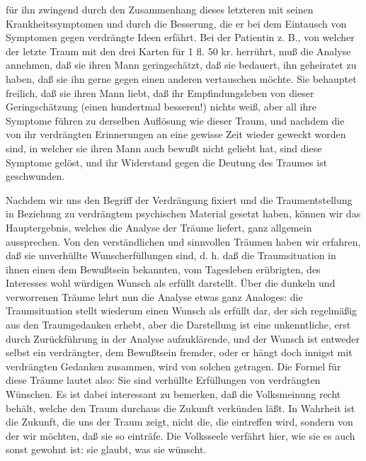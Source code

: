 \documentclass[twoside=true,titlepage=false,open=any, parskip=never, fontsize=10pt, headings=small, chapterprefix=false, appendixprefix=false]{scrbook}
\begin{document}
        \pstart
        für ihn zwingend durch den Zusammenhang dieses letzteren mit seinen
               Krankheitssymptomen und durch die Besserung, die er bei dem Eintausch von
               Symptomen gegen verdrängte Ideen erfährt. Bei der Patientin z. B., von welcher
               der letzte Traum mit den drei Karten für 1 fl. 50 kr. herrührt, muß die
               Analyse annehmen, daß sie ihren Mann geringschätzt, daß sie bedauert, ihn
               geheiratet zu haben, daß sie ihn gerne gegen einen anderen vertauschen möchte.
               Sie behauptet freilich, daß sie ihren Mann liebt, daß ihr Empfindungsleben von
               dieser Geringschätzung (einen hundertmal besseren!) nichts weiß, aber
               all ihre Symptome führen zu derselben Auflösung wie dieser Traum, und nachdem
               die von ihr verdrängten Erinnerungen an eine gewisse Zeit wieder geweckt
               worden sind, in welcher sie ihren Mann auch bewußt nicht geliebt hat, sind diese
               Symptome gelöst, und ihr Widerstand gegen die Deutung des Traumes ist
               geschwunden.
        \pend
    
         
            
            
            \pstart{}\pend
            
        \pstart
        Nachdem wir uns den Begriff der Verdrängung fixiert und die Traumentstellung in
               Beziehung zu verdrängtem psychischen Material gesetzt haben, können wir das
               Hauptergebnis, welches die Analyse der Träume liefert, ganz allgemein
               aussprechen. Von den verständlichen und sinnvollen Träumen haben wir
               erfahren, daß sie unverhüllte Wunscherfüllungen sind, d. h. daß die Traumsituation in ihnen einen dem Bewußtsein bekannten, vom Tagesleben erübrigten, des Interesses wohl würdigen Wunsch als erfüllt
               darstellt. Über die dunkeln und verworrenen Träume lehrt nun die Analyse etwas
               ganz Analoges: die Traumsituation stellt wiederum einen Wunsch als erfüllt dar,
               der sich regelmäßig aus den Traumgedanken erhebt, aber die
               Darstellung ist eine unkenntliche, erst durch Zurückführung in der Analyse
               aufzuklärende, und der Wunsch ist entweder selbst ein verdrängter,
               dem Bewußtsein fremder, oder er hängt doch innigst mit verdrängten Gedanken
               zusammen, wird von solchen getragen. Die Formel für diese Träume lautet also:
                  Sie sind verhüllte Erfüllungen von verdrängten Wünschen. Es
               ist dabei interessant zu bemerken, daß die Volksmeinung recht behält, welche den
               Traum durchaus die Zukunft verkünden läßt. In Wahrheit ist die Zukunft, die uns
               der Traum zeigt, nicht die, die eintreffen wird, sondern von der wir
               möchten, daß sie so einträfe. Die Volksseele verfährt hier, wie sie es auch
               sonst gewohnt ist: sie glaubt, was sie wünscht.
        \pend
    
\end{document}
